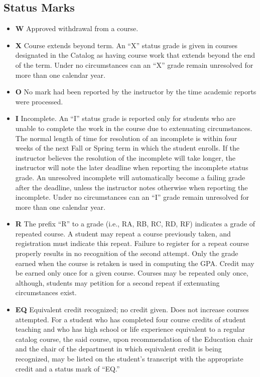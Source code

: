 \documentclass[
  letterpaper,
]{scrbook}
\providecommand{\tightlist}{%
  \setlength{\itemsep}{0pt}\setlength{\parskip}{0pt}}
\begin{document}
\hypertarget{status-marks}{%
\subsection{Status Marks}\label{status-marks}}

\begin{itemize}
\tightlist
\item
  \textbf{W} Approved withdrawal from a course.
\item
  \textbf{X} Course extends beyond term. An ``X'' status grade is given
  in courses designated in the Catalog as having course work that
  extends beyond the end of the term. Under no circumstances can an
  ``X'' grade remain unresolved for more than one calendar year.
\item
  \textbf{O} No mark had been reported by the instructor by the time
  academic reports were processed.
\item
  \textbf{I} Incomplete. An ``I'' status grade is reported only for
  students who are unable to complete the work in the course due to
  extenuating circumstances. The normal length of time for resolution of
  an incomplete is within four weeks of the next Fall or Spring term in
  which the student enrolls. If the instructor believes the resolution
  of the incomplete will take longer, the instructor will note the later
  deadline when reporting the incomplete status grade. An unresolved
  incomplete will automatically become a failing grade after the
  deadline, unless the instructor notes otherwise when reporting the
  incomplete. Under no circumstances can an ``I'' grade remain
  unresolved for more than one calendar year.
\item
  \textbf{R} The prefix ``R'' to a grade (i.e., RA, RB, RC, RD, RF)
  indicates a grade of repeated course. A student may repeat a course
  previously taken, and registration must indicate this repeat. Failure
  to register for a repeat course properly results in no recognition of
  the second attempt. Only the grade earned when the course is retaken
  is used in computing the GPA. Credit may be earned only once for a
  given course. Courses may be repeated only once, although, students
  may petition for a second repeat if extenuating circumstances exist.
\item
  \textbf{EQ} Equivalent credit recognized; no credit given. Does not
  increase courses attempted. For a student who has completed four
  course credits of student teaching and who has high school or life
  experience equivalent to a regular catalog course, the said course,
  upon recommendation of the Education chair and the chair of the
  department in which equivalent credit is being recognized, may be
  listed on the student's transcript with the appropriate credit and a
  status mark of ``EQ.''
\end{itemize}
\end{document}
